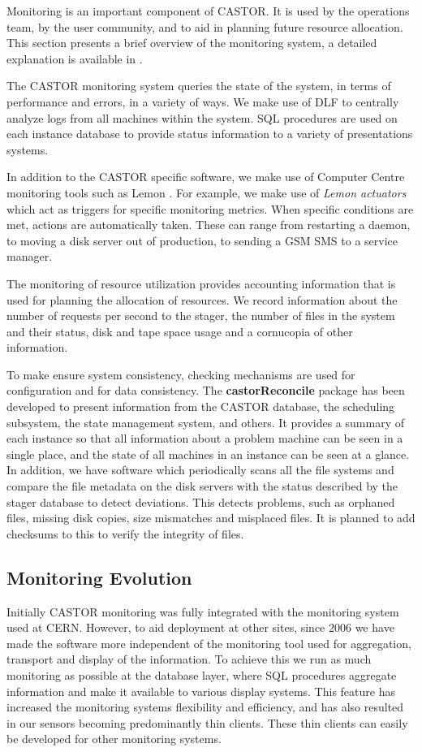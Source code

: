Monitoring is an important component of CASTOR. It is used
by the operations team, by the user community, and to aid in
planning future resource allocation. This section presents a
brief overview of the monitoring system, a detailed explanation is
available in \cite{chepmon}.

The CASTOR monitoring system queries the state of the system, in terms
of performance and errors, in a variety of ways. We make use of DLF
to centrally analyze logs from all machines within the
system. SQL procedures are used on each instance database to provide
status information to a variety of presentations systems.

In addition to the CASTOR specific software, we make use of Computer
Centre monitoring tools such as Lemon \cite{lemon}. For example, we
make  use of \textit{Lemon actuators} which act as triggers for
specific monitoring metrics. When specific conditions are met, actions
are automatically  taken. These can range from restarting a daemon, to
moving a disk server out of production, to sending a GSM SMS to a
service manager.

The monitoring of resource utilization provides accounting information
that is used for planning the allocation of resources. We
record information about the number of requests per second to the
stager, the number of files in the system and their status, disk and
tape space usage and a cornucopia of other information.

To make ensure system consistency, checking mechanisms are used
for configuration and for data consistency. The
{\bf castorReconcile} package has been developed to present  information
from the CASTOR database, the scheduling subsystem, the state
management system, and others. It provides  a summary of each instance
so that all information about a problem machine can be seen in a
single place, and the state of all machines in an instance can be seen
at a glance. In addition, we have software which periodically scans
all the file systems and compare the file metadata on the disk servers
with the status described by the stager database to detect
deviations. This detects problems, such as orphaned files, missing
disk copies, size mismatches and misplaced files. It is planned to add
checksums to this to verify the integrity of files.

\subsection{Monitoring Evolution}

Initially CASTOR monitoring was fully integrated with the monitoring
system used at CERN. However, to aid deployment at other sites, since
2006 we have made the software more independent of the monitoring tool
used for aggregation, transport and display of the information.  To
achieve this we run as much monitoring as possible at the database
layer, where SQL procedures aggregate information and make it
available to various display systems.  This feature has increased the
monitoring systems flexibility and  efficiency, and has also resulted
in our sensors becoming  predominantly thin clients. These thin
clients can easily be  developed for other monitoring systems.

